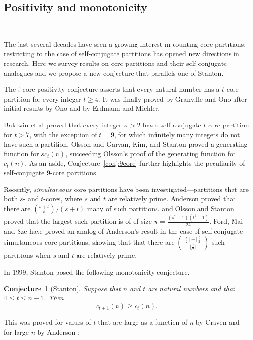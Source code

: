 \documentclass[12pt,leqno]{amsart}
\newtheorem*{conje}{Conjecture}
\numberwithin{equation}{section}
\theoremstyle{definition}
\begin{document}
\subsection{Positivity and monotonicity}\

The last several decades have seen a growing interest in counting core partitions; restricting to the case of self-conjugate partitions has opened new directions in research. Here we survey results on core partitions and their self-conjugate analogues and we propose a new conjecture that parallels one of Stanton. 

The $t$-core positivity conjecture asserts that every natural number has a $t$-core partition for every integer $t\geq 4$. It was finally proved by Granville and Ono \cite{GranOno} after initial results by Ono and by Erdmann and Michler.

Baldwin et al \cite{Baldwin} proved that every integer $n>2$ has a self-conjugate $t$-core partition for $t>7$, with the exception of $t=9$, for which infinitely many integers do not have such a partition. Olsson \cite{Olsson90} and Garvan, Kim, and Stanton \cite{Garvan} proved a generating function for $sc_t(n)$, succeeding Olsson's \cite{Olsson76} proof of the generating function for $c_t(n)$.  As an aside, Conjecture~\ref{conj:9core} further highlights the peculiarity of self-conjugate $9$-core partitions.

Recently, {\it simultaneous} core partitions have been investigated---partitions that are both $s$- and $t$-cores, where $s$ and $t$ are relatively prime. Anderson \cite{And02} proved that there are $\binom{s+t}{t}\big/(s+t)$ many of such partitions, and Olsson and Stanton \cite{OlssonStanton} proved that the largest such partition is of of size $n=\frac{(s^2-1)(t^2-1)}{24}$.  Ford, Mai and Sze \cite{Ford} have proved an analog of Anderson's result in the case of self-conjugate simultaneous core partitions, showing that that there are $\binom{\lfloor \frac{s}{2} \rfloor + \lfloor \frac{t}{2} \rfloor}{\lfloor \frac{t}{2} \rfloor}$ such partitions when $s$ and $t$ are relatively prime.

\medskip
In 1999, Stanton \cite{Stanton} posed the following monotonicity conjecture.

\begin{conje}[Stanton] 
\label{conj:Stanton}
Suppose that $n$ and $t$ are natural numbers and that $4\leq t\leq n-1$. Then
\[
c_{t+1}(n)\geq c_t(n).
\]
\end{conje}

This was proved for values of $t$ that are large as a function of $n$ by Craven \cite{Craven} and for large $n$ by Anderson \cite{Anderson}:
\end{document}
